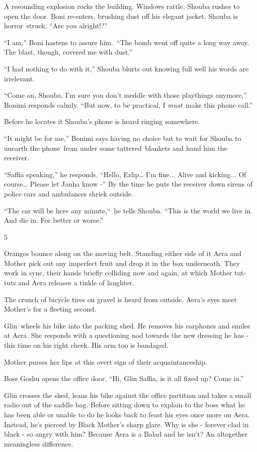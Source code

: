 \documentclass[twoside,11pt]{book}
\begin{document}
A resounding explosion rocks the building. Windows rattle. Shouba rushes to open the door. Boni re-enters, brushing dust
off his elegant jacket. Shouba is horror\ struck. ``Are you alright!?'' 

``I am,'' Boni hastens to assure him.\ {}``The bomb went off quite a long way away. The blast, though,
covered me with dust.'' 

``I had nothing to do with it,'' Shouba blurts out knowing full well his words are irrelevant.

``Come on, Shouba, I'm sure you don't meddle with those playthings anymore,'' Bonimi responds
calmly.  ``But now, to be practical, I \textit{must\ }make this phone call.''

 Before he locates it Shouba's phone is heard ringing somewhere. 

``It might be for me,'' Bonimi says having no choice but to wait for Shouba to unearth the
phone~from under some tattered{\ }blankets and hand him the receiver. 

``Saffia speaking,'' he responds. ``Hello, Ezlip{\dots} I'm fine... Alive and
kicking... Of course{\dots} Please let Janha know -'' By the time he puts the receiver down sirens of
police cars and ambulances shriek outside. 

``The car will be here any minute,``~he tells Shouba. ``This is the world we live
in. And die in. For better or worse.''


\bigskip

5 

Oranges bounce along on the moving belt. Standing either side of it Aera and Mother pick out any imperfect fruit and
drop it in the box underneath. They work in sync, their hands briefly colliding now and again, at which Mother tut-tuts
and Aera releases a tinkle of laughter. 

The crunch of bicycle tires on gravel is heard from outside. Aera's eyes meet Mother's for a fleeting second. 

Glin~wheels his bike into the packing shed. He removes his earphones and smiles at Aera. She responds with a questioning
nod towards the new dressing he has - this time on his right cheek. His arm too is bandaged. 

Mother purses her lips at this overt sign of their acquaintanceship.~~~~~~~ 

Boss Goshu opens the office door, ``Hi, Glin Saffia, is it all fixed up? Come in.''

Glin crosses the shed, leans his bike against the office partition and takes a small radio out of the saddle bag. Before
sitting down to explain to the boss what he has been able or unable to do he looks back to feast his eyes once more on
Aera. Instead, he's pierced by Black Mother's sharp glare. Why is she - forever clad in black - so angry with him?
Because Aera is a Balad and he isn't? An altogether meaningless difference.
\end{document}
